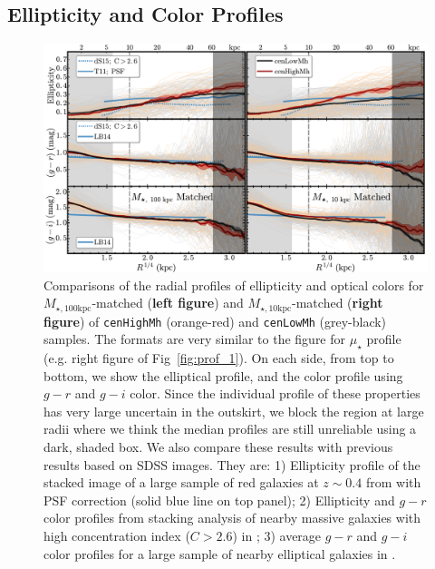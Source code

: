 \documentclass{emulateapj}
\def\rbcg{\texttt{cenHighMh}}
\def\nbcg{\texttt{cenLowMh}}
\def\minn{{$M_{\star,10\mathrm{kpc}}$}}
\def\mtot{{$M_{\star,100\mathrm{kpc}}$}}
\def\mden{{$\mu_{\star}$}}
\begin{document}
\begin{CJK*}{UTF8}{gbsn}
\subsection{Ellipticity and Color Profiles}
    \label{ssec:ell_color}
    
  \begin{figure}[t!]
      \centering 
      \includegraphics[width=\textwidth]{fig/redbcg_discussion_2}
      \caption{
          Comparisons of the radial profiles of ellipticity and optical colors 
      	  for \mtot{}-matched (\textbf{left figure}) and \minn{}-matched 
      	  (\textbf{right figure}) of \rbcg{} (orange-red) and \nbcg{} (grey-black) samples. 
          The formats are very similar to the figure for \mden{} profile 
          (e.g. right figure of Fig~\ref{fig:prof_1}). 
          On each side, from top to bottom, we show the elliptical profile, and the 
          color profile using $g-r$ and $g-i$ color. 
          Since the individual profile of these properties has very large uncertain in the 
          outskirt, we block the region at large radii where we think the median profiles 
          are still unreliable using a dark, shaded box.
          We also compare these results with previous results based on SDSS images. 
          They are: 
          1) Ellipticity profile of the stacked image of a large sample of red galaxies at 
          $z\sim 0.4$ from \citet{Tal2011} with PSF correction 
          (solid blue line on top panel); 
          2) Ellipticity and $g-r$ color profiles from stacking analysis of nearby massive 
          galaxies with high concentration index ($C>2.6$) in \citet[][blue dash lines 
          on the top and middle panels]{DSouza2014}; 
          3) average $g-r$ and $g-i$ color profiles for a large sample of nearby 
          elliptical galaxies in \citet[][blue, solid lines on the middle and bottom 
          panels]{LaBarbera2010}.
          }
      \label{fig:ell_color}
  \end{figure}
    

\end{CJK*}
\end{document}
